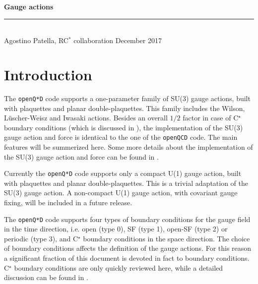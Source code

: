 \documentclass[11pt,fleqn]{article}
\begin{document}
\vspace*{20mm}

{
\sffamily
\huge
\textbf{Gauge actions}
\\
\rule{\textwidth}{1pt}
\\[2mm]
\large
Agostino Patella, RC$^*$ collaboration
\hfill
December 2017
}

\vspace{30mm}


\tableofcontents

\pagebreak


\section{Introduction}

The \texttt{openQ*D} code supports a one-parameter family of SU(3) gauge actions, built with plaquettes and planar double-plaquettes. This family includes the Wilson, L\"uscher-Weisz and Iwasaki actions. Besides an overall $1/2$ factor in case of C$^\star$ boundary conditions (which is discussed in \cite{cstar}), the implementation of the SU(3) gauge action and force is identical to the one of the \texttt{openQCD} code. The main features will be summerized here. Some more details about the implementation of the SU(3) gauge action and force can be found in \cite{openQCD:gauge_action}.

%   

Currently the \texttt{openQ*D} code supports only a compact U(1) gauge action, built with plaquettes and planar double-plaquettes. This is a trivial adaptation of the SU(3) gauge action. A non-compact U(1) gauge action, with covariant gauge fixing, will be included in a future release.

The \texttt{openQ*D} code supports four types of boundary conditions for the gauge field in the time direction, i.e. open (type 0), SF (type 1), open-SF (type 2) or periodic (type 3), and C$^\star$ boundary conditions in the space direction. The choice of boundary conditions affects the definition of the gauge actions. For this reason a significant fraction of this document is devoted in fact to boundary conditions. C$^\star$ boundary conditions are only quickly reviewed here, while a detailed discussion can be found in \cite{cstar}.
\end{document}

